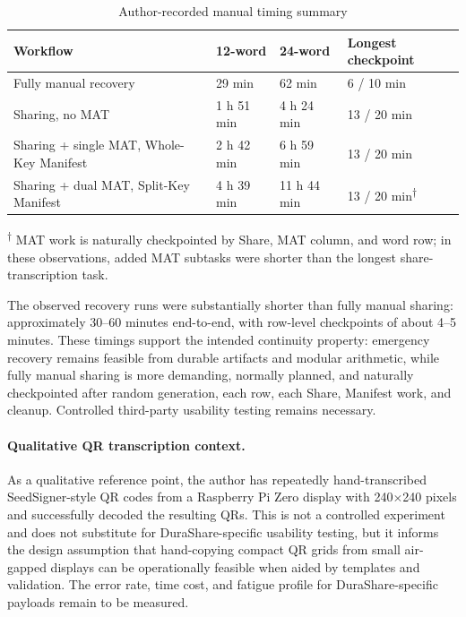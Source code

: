 \documentclass[11pt]{article}
\begin{document}
\begin{table}[H]
\centering
\caption{Author-recorded manual timing summary}
\label{tab:manual-timing-summary}
\footnotesize
\begin{tabular}{@{}p{}p{}p{}p{}@{}}
\toprule
\textbf{Workflow} & \textbf{12-word} & \textbf{24-word} & \textbf{Longest checkpoint} \\ \midrule
Fully manual recovery & 29 min & 62 min & 6 / 10 min \\
Sharing, no MAT & 1 h 51 min & 4 h 24 min & 13 / 20 min \\
Sharing + single MAT, Whole-Key Manifest & 2 h 42 min & 6 h 59 min & 13 / 20 min \\
Sharing + dual MAT, Split-Key Manifest & 4 h 39 min & 11 h 44 min & 13 / 20 min\textsuperscript{$\dagger$} \\
\bottomrule
\end{tabular}

\medskip
\footnotesize
\textsuperscript{$\dagger$} MAT work is naturally checkpointed by Share, MAT column, and word row; in these observations, added MAT subtasks were shorter than the longest share-transcription task.
\end{table}

The observed recovery runs were substantially shorter than fully manual sharing: approximately 30--60 minutes end-to-end, with row-level checkpoints of about 4--5 minutes. These timings support the intended continuity property: emergency recovery remains feasible from durable artifacts and modular arithmetic, while fully manual sharing is more demanding, normally planned, and naturally checkpointed after random generation, each row, each Share, Manifest work, and cleanup. Controlled third-party usability testing remains necessary.

\paragraph{Qualitative QR transcription context.} As a qualitative reference point, the author has repeatedly hand-transcribed SeedSigner-style QR codes from a Raspberry Pi Zero display with 240$\times$240 pixels and successfully decoded the resulting QRs. This is not a controlled experiment and does not substitute for DuraShare-specific usability testing, but it informs the design assumption that hand-copying compact QR grids from small air-gapped displays can be operationally feasible when aided by templates and validation. The error rate, time cost, and fatigue profile for DuraShare-specific payloads remain to be measured.
\end{document}
